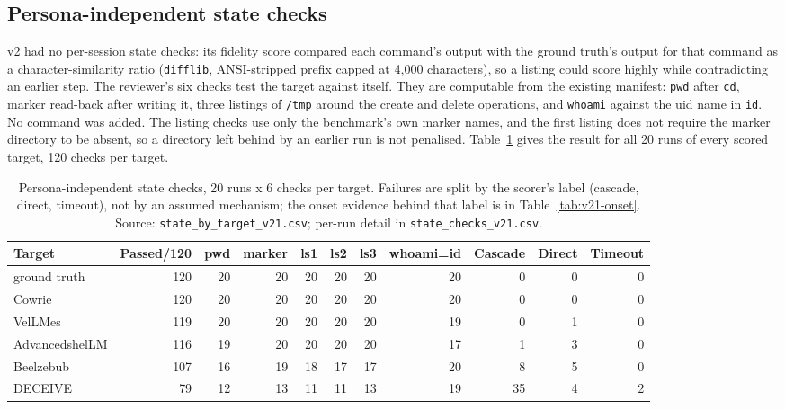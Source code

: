 \documentclass[a4paper,11pt]{article}
\begin{document}
\subsection{Persona-independent state checks}
\label{sec:v21-state}

v2 had no per-session state checks: its fidelity score compared each command's
output with the ground truth's output for that command as a character-similarity ratio (\texttt{difflib}, ANSI-stripped prefix capped at 4{,}000 characters), so a listing could score highly while contradicting an earlier step. The reviewer's six checks test the target against itself. They
are computable from the existing manifest: \texttt{pwd} after \texttt{cd},
marker read-back after writing it, three listings of \texttt{/tmp} around the
create and delete operations, and \texttt{whoami} against the uid name in
\texttt{id}. No command was added. The listing checks use only the benchmark's
own marker names, and the first listing does not require the marker directory to
be absent, so a directory left behind by an earlier run is not penalised.
Table~\ref{tab:v21-state} gives the result for all 20 runs of every scored
target, 120 checks per target.

\begin{table}[ht]
\centering
\caption{Persona-independent state checks, 20 runs x 6 checks per target.
Failures are split by the scorer's label (cascade, direct, timeout), not by an
assumed mechanism; the onset evidence behind that label is in
Table~\ref{tab:v21-onset}. Source:
\texttt{state\_by\_target\_v21.csv}; per-run detail in
\texttt{state\_checks\_v21.csv}.}
\label{tab:v21-state}
\scriptsize
\setlength{\tabcolsep}{3.5pt}
\begin{tabular}{@{}l r r r r r r r r r r@{}}
\toprule
Target & Passed/120 & pwd & marker & ls1 & ls2 & ls3 & whoami=id & Cascade & Direct & Timeout \\
\midrule
ground truth & 120 & 20 & 20 & 20 & 20 & 20 & 20 & 0 & 0 & 0 \\
Cowrie & 120 & 20 & 20 & 20 & 20 & 20 & 20 & 0 & 0 & 0 \\
VelLMes & 119 & 20 & 20 & 20 & 20 & 20 & 19 & 0 & 1 & 0 \\
AdvancedshelLM & 116 & 19 & 20 & 20 & 20 & 20 & 17 & 1 & 3 & 0 \\
Beelzebub & 107 & 16 & 19 & 18 & 17 & 17 & 20 & 8 & 5 & 0 \\
DECEIVE & 79 & 12 & 13 & 11 & 11 & 13 & 19 & 35 & 4 & 2 \\
\bottomrule
\end{tabular}
\end{table}
\end{document}
